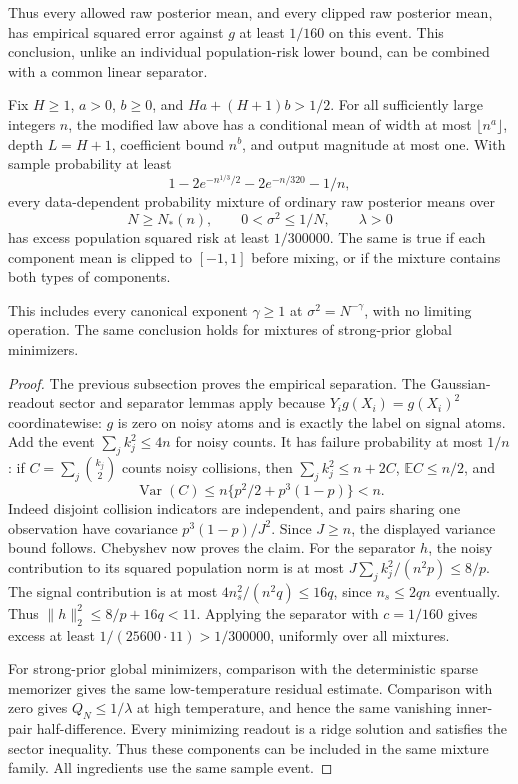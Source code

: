 Thus every allowed raw posterior mean, and every clipped raw
posterior mean, has empirical squared error against $g$ at least
$1/160$ on this event. This conclusion, unlike an individual
population-risk lower bound, can be combined with a common linear
separator.

\begin{theorem}
\label{thm:relu-mixture-failure}
Fix $H\ge1$, $a>0$, $b\ge0$, and $Ha+(H+1)b>1/2$.
For all sufficiently large integers $n$, the modified law above has a
conditional mean of width at most $\lfloor n^a\rfloor$, depth
$L=H+1$, coefficient bound $n^b$, and output magnitude at most one.
With sample probability at least
\[
 1-2e^{-n^{1/3}/2}-2e^{-n/320}-1/n,
\]
every data-dependent probability mixture of ordinary raw posterior
means over
\[
 N\ge N_*(n),\qquad 0<\sigma^2\le1/N,\qquad \lambda>0
\]
has excess population squared risk at least $1/300000$.
The same is true if each component mean is clipped to $[-1,1]$
before mixing, or if the mixture contains both types of components.

This includes every canonical exponent $\gamma\ge1$ at
$\sigma^2=N^{-\gamma}$, with no limiting operation. The same
conclusion holds for mixtures of strong-prior global minimizers.
\end{theorem}
\begin{proof}
The previous subsection proves the empirical separation. The
Gaussian-readout sector and separator lemmas apply because
$Y_i g(X_i)=g(X_i)^2$ coordinatewise: $g$ is zero on noisy atoms and
is exactly the label on signal atoms. Add the event
$\sum_j k_j^2\le4n$ for noisy counts. It has failure probability at
most $1/n$: if $C=\sum_j\binom{k_j}{2}$ counts noisy collisions,
then $\sum_jk_j^2\le n+2C$, $\mathbb EC\le n/2$, and
\[
 \operatorname{Var}(C)
 \le n\{p^2/2+p^3(1-p)\}<n.
\]
Indeed disjoint collision indicators are independent, and pairs
sharing one observation have covariance $p^3(1-p)/J^2$. Since $J\ge n$, the displayed variance bound follows.
Chebyshev now proves the claim.
For the separator $h$, the noisy contribution to its squared
population norm is at most
$J\sum_j k_j^2/(n^2p)\le8/p$. The signal contribution is at most
$4n_s^2/(n^2q)\le16q$, since $n_s\le2qn$ eventually.
Thus $\|h\|_2^2\le8/p+16q<11$. Applying the separator with $c=1/160$ gives excess at
least $1/(25600\cdot11)>1/300000$, uniformly over all mixtures.

For strong-prior global minimizers, comparison with the deterministic
sparse memorizer gives the same low-temperature residual estimate.
Comparison with zero gives $Q_N\le1/\lambda$ at high temperature,
and hence the same vanishing inner-pair half-difference. Every
minimizing readout is a ridge solution and satisfies the sector
inequality. Thus these components can be included in the same
mixture family. All ingredients use the same sample event.
\end{proof}

